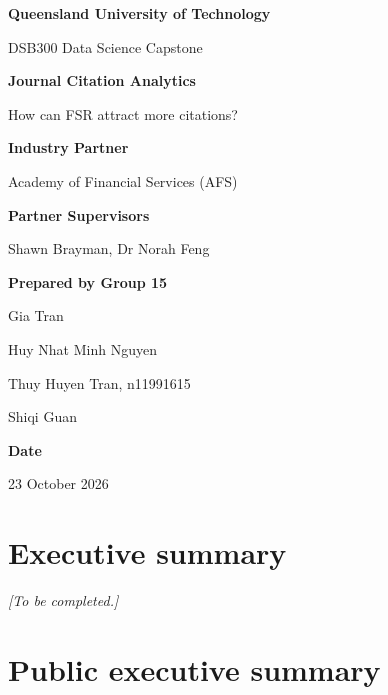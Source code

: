 \documentclass[11pt,a4paper]{article}
\begin{document}
\hypersetup{pageanchor=false}
\begin{titlepage}
\centering
{\large\bfseries Queensland University of Technology\par}
\vspace{0.3em}
{DSB300 Data Science Capstone\par}
\vspace{4cm}
{\Huge\bfseries Journal Citation Analytics\par}
\vspace{0.8em}
{\Large How can FSR attract more citations?\par}
\vspace{3cm}
{\bfseries Industry Partner\par}
Academy of Financial Services (AFS)\par
\vspace{1em}
{\bfseries Partner Supervisors\par}
Shawn Brayman, Dr Norah Feng\par
\vspace{3cm}
{\bfseries Prepared by Group 15\par}
Gia Tran\par
Huy Nhat Minh Nguyen\par
Thuy Huyen Tran, n11991615\par
Shiqi Guan\par
\vfill
{\bfseries Date\par}
23 October 2026\par
\end{titlepage}
\hypersetup{pageanchor=true}

\section{Executive summary}\label{executive-summary}

\textit{[To be completed.]}

\clearpage

\section{Public executive summary}\label{public-executive-summary}
\end{document}
